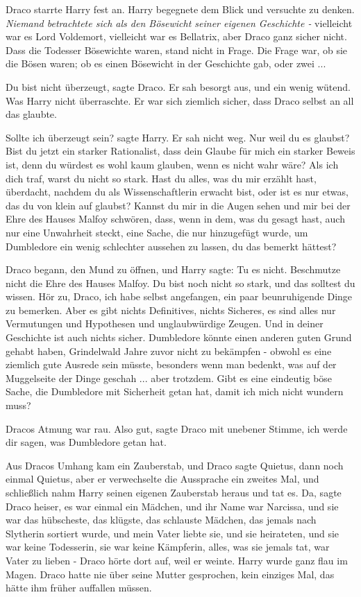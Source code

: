 Draco starrte Harry fest an. Harry begegnete dem Blick und versuchte zu denken.
\emph{Niemand betrachtete sich als den Bösewicht seiner eigenen Geschichte -}
vielleicht war es Lord Voldemort, vielleicht war es Bellatrix, aber Draco ganz
sicher nicht. Dass die Todesser Bösewichte waren, stand nicht in Frage. Die
Frage war, ob sie die Bösen waren; ob es einen Bösewicht in der Geschichte gab,
oder zwei ...

\glqq{}Du bist nicht überzeugt\grqq{}, sagte Draco. Er sah besorgt aus, und ein
wenig wütend. Was Harry nicht überraschte. Er war sich ziemlich sicher, dass
Draco selbst an all das glaubte.

\glqq{}Sollte ich überzeugt sein?\grqq{} sagte Harry. Er sah nicht weg. \glqq{}Nur
weil du es glaubst? Bist du jetzt ein starker Rationalist, dass dein Glaube für
mich ein starker Beweis ist, denn du würdest es wohl kaum glauben, wenn es nicht
wahr wäre? Als ich dich traf, warst du nicht so stark. Hast du alles, was du mir
erzählt hast, überdacht, nachdem du als Wissenschaftlerin erwacht bist, oder ist
es nur etwas, das du von klein auf glaubst? Kannst du mir in die Augen sehen und
mir bei der Ehre des Hauses Malfoy schwören, dass, wenn in dem, was du gesagt
hast, auch nur eine Unwahrheit steckt, eine Sache, die nur hinzugefügt wurde, um
Dumbledore ein wenig schlechter aussehen zu lassen, du das bemerkt
hättest?\grqq{}

Draco begann, den Mund zu öffnen, und Harry sagte: \glqq{}Tu es nicht. Beschmutze
nicht die Ehre des Hauses Malfoy. Du bist noch nicht so stark, und das solltest
du wissen. Hör zu, Draco, ich habe selbst angefangen, ein paar beunruhigende
Dinge zu bemerken. Aber es gibt nichts Definitives, nichts Sicheres, es sind
alles nur Vermutungen und Hypothesen und unglaubwürdige Zeugen. Und in deiner
Geschichte ist auch nichts sicher. Dumbledore könnte einen anderen guten Grund
gehabt haben, Grindelwald Jahre zuvor nicht zu bekämpfen - obwohl es eine
ziemlich gute Ausrede sein müsste, besonders wenn man bedenkt, was auf der
Muggelseite der Dinge geschah ... aber trotzdem. Gibt es eine eindeutig böse
Sache, die Dumbledore mit Sicherheit getan hat, damit ich mich nicht wundern
muss?\grqq{}

Dracos Atmung war rau. \glqq{}Also gut\grqq{}, sagte Draco mit unebener Stimme,
\glqq{}ich werde dir sagen, was Dumbledore getan hat.\grqq{}

Aus Dracos Umhang kam ein Zauberstab, und Draco sagte \glqq{}Quietus\grqq{}, dann
noch einmal \glqq{}Quietus\grqq{}, aber er verwechselte die Aussprache ein
zweites Mal, und schließlich nahm Harry seinen eigenen Zauberstab heraus und tat
es. \glqq{}Da\grqq{}, sagte Draco heiser, \glqq{}es war einmal ein Mädchen, und
ihr Name war Narcissa, und sie war das hübscheste, das klügste, das schlauste
Mädchen, das jemals nach Slytherin sortiert wurde, und mein Vater liebte sie,
und sie heirateten, und sie war keine Todesserin, sie war keine Kämpferin,
alles, was sie jemals tat, war Vater zu lieben -\grqq{} Draco hörte dort auf,
weil er weinte. Harry wurde ganz flau im Magen. Draco hatte nie über seine
Mutter gesprochen, kein einziges Mal, das hätte ihm früher auffallen müssen.

